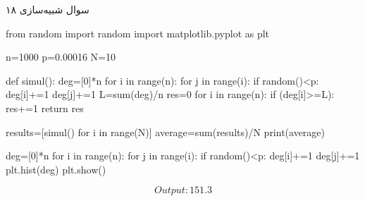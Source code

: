 سوال شبیه‌سازی ۱۸

\begin{latin}
\begin{python}
from random import random
import matplotlib.pyplot as plt

n=1000
p=0.00016
N=10

def simul():
	deg=[0]*n
	for i in range(n):
		for j in range(i):
			if random()<p:
				deg[i]+=1
				deg[j]+=1
	L=sum(deg)/n
	res=0
	for i in range(n):
		if (deg[i]>=L):
			res+=1
	return res

results=[simul() for i in range(N)]
average=sum(results)/N
print(average)


deg=[0]*n
for i in range(n):
	for j in range(i):
		if random()<p:
			deg[i]+=1
			deg[j]+=1
plt.hist(deg)
plt.show()
\end{python}
\end{latin}

$$
Output: 151.3
$$